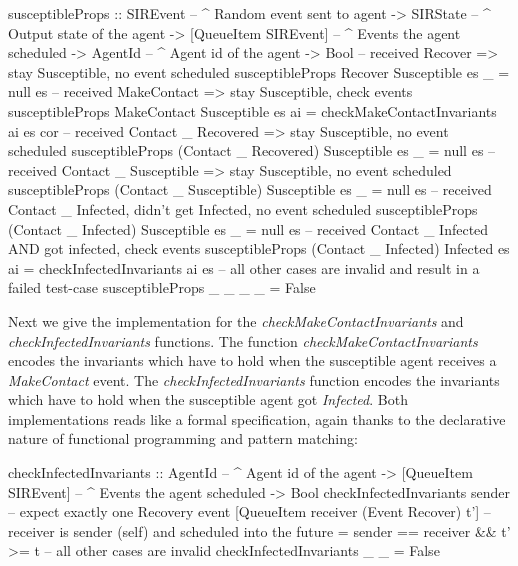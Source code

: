 \begin{HaskellCode}
susceptibleProps :: SIREvent              -- ^ Random event sent to agent
                 -> SIRState              -- ^ Output state of the agent
                 -> [QueueItem SIREvent]  -- ^ Events the agent scheduled
                 -> AgentId               -- ^ Agent id of the agent
                 -> Bool
-- received Recover => stay Susceptible, no event scheduled
susceptibleProps Recover Susceptible es _ = null es
-- received MakeContact => stay Susceptible, check events
susceptibleProps MakeContact Susceptible es ai
  = checkMakeContactInvariants ai es cor 
-- received Contact _ Recovered => stay Susceptible, no event scheduled
susceptibleProps (Contact _ Recovered) Susceptible es _ = null es
-- received Contact _ Susceptible => stay Susceptible, no event scheduled
susceptibleProps (Contact _ Susceptible) Susceptible es _  = null es
-- received Contact _ Infected, didn't get Infected, no event scheduled
susceptibleProps (Contact _ Infected) Susceptible es _ = null es
-- received Contact _ Infected AND got infected, check events
susceptibleProps (Contact _ Infected) Infected es ai
  = checkInfectedInvariants ai es
-- all other cases are invalid and result in a failed test-case
susceptibleProps _ _ _ _ = False
\end{HaskellCode}

Next we give the implementation for the \textit{checkMakeContactInvariants} and \textit{checkInfectedInvariants} functions. The function \textit{checkMakeContactInvariants} encodes the invariants which have to hold when the susceptible agent receives a \textit{MakeContact} event. The \textit{checkInfectedInvariants} function encodes the invariants which have to hold when the susceptible agent got \textit{Infected}. Both implementations reads like a formal specification, again thanks to the declarative nature of functional programming and pattern matching:

\begin{HaskellCode}
checkInfectedInvariants :: AgentId              -- ^ Agent id of the agent 
                        -> [QueueItem SIREvent] -- ^ Events the agent scheduled
                        -> Bool
checkInfectedInvariants sender 
  -- expect exactly one Recovery event
  [QueueItem receiver (Event Recover) t'] 
  -- receiver is sender (self) and scheduled into the future
  = sender == receiver && t' >= t 
-- all other cases are invalid
checkInfectedInvariants _ _ = False
\end{HaskellCode}

